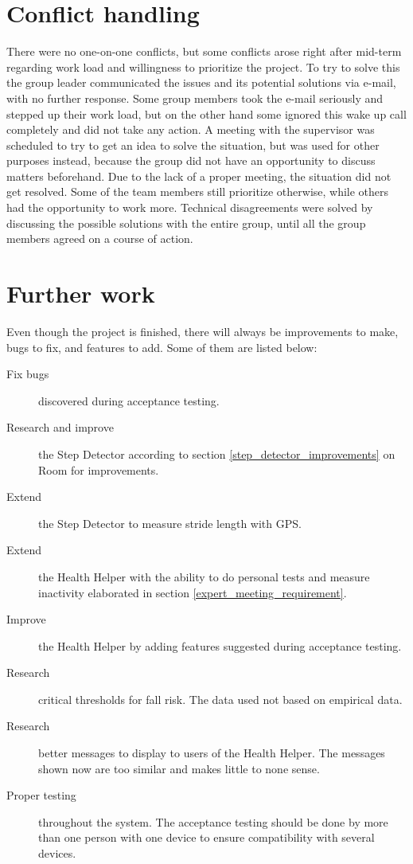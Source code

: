 \section{Conflict handling}
There were no one-on-one conflicts, but some conflicts arose right after mid-term regarding work load and willingness to prioritize the project. To try to solve this the group leader communicated the issues and its potential solutions via e-mail, with no further response. Some group members took the e-mail seriously and stepped up their work load, but on the other hand some ignored this wake up call completely and did not take any action. A meeting with the supervisor was scheduled to try to get an idea to solve the situation, but was used for other purposes instead, because the group did not have an opportunity to discuss matters beforehand. Due to the lack of a proper meeting, the situation did not get resolved. Some of the team members still prioritize otherwise, while others had the opportunity to work more.
Technical disagreements were solved by discussing the possible solutions with the entire group, until all the group members agreed on a course of action.

\section{Further work}
Even though the project is finished, there will always be improvements to make, bugs to fix, and features to add. Some of them are listed below:
\begin{description}
\item[Fix bugs] discovered during acceptance testing.
\item[Research and improve] the Step Detector according to section \ref{step_detector_improvements} on Room for improvements. 
\item[Extend] the Step Detector to measure stride length with GPS.
\item[Extend] the Health Helper with the ability to do personal tests and measure inactivity elaborated in section \ref{expert_meeting_requirement}.
\item[Improve] the Health Helper by adding features suggested during acceptance testing.
\item[Research] critical thresholds for fall risk. The data used not based on empirical data.
\item[Research] better messages to display to users of the Health Helper. The messages shown now are too similar and makes little to none sense.
\item[Proper testing] throughout the system. The acceptance testing should be done by more than one person with one device to ensure compatibility with several devices.
\end{description}